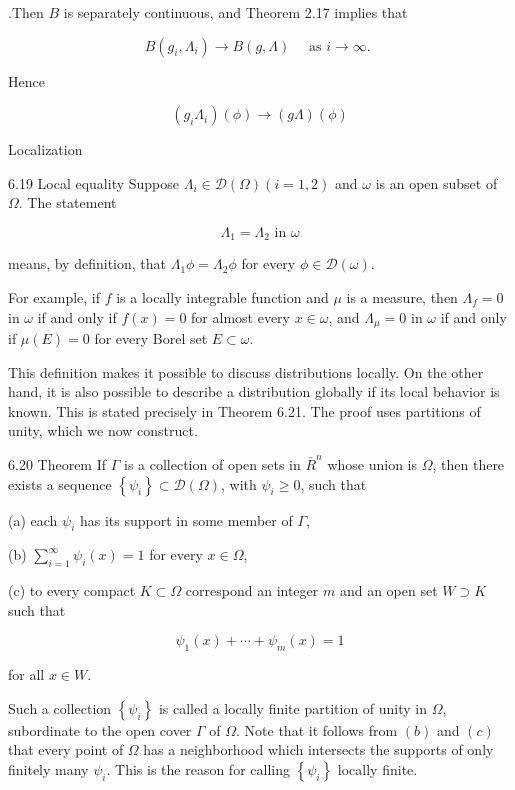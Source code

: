 \documentclass[10pt]{article}
\begin{document}
.Then $B$ is separately continuous, and Theorem 2.17 implies that

$$
B\left(g_{i}, \Lambda_{i}\right) \rightarrow B(g, \Lambda) \quad \text { as } i \rightarrow \infty \text {. }
$$

Hence

$$
\left(g_{i} \Lambda_{i}\right)(\phi) \rightarrow(g \Lambda)(\phi)
$$

Localization

6.19 Local equality Suppose $\Lambda_{i} \in \mathscr{D}(\Omega)(i=1,2)$ and $\omega$ is an open subset of $\Omega$. The statement

$$
\Lambda_{1}=\Lambda_{2} \text { in } \omega
$$

means, by definition, that $\Lambda_{1} \phi=\Lambda_{2} \phi$ for every $\phi \in \mathscr{D}(\omega)$.

For example, if $f$ is a locally integrable function and $\mu$ is a measure, then $\Lambda_{f}=0$ in $\omega$ if and only if $f(x)=0$ for almost every $x \in \omega$, and $\Lambda_{\mu}=0$ in $\omega$ if and only if $\mu(E)=0$ for every Borel set $E \subset \omega$.

This definition makes it possible to discuss distributions locally. On the other hand, it is also possible to describe a distribution globally if its local behavior is known. This is stated precisely in Theorem 6.21. The proof uses partitions of unity, which we now construct.

6.20 Theorem If $\Gamma$ is a collection of open sets in $\bar{R}^{n}$ whose union is $\Omega$, then there exists a sequence $\left\{\psi_{i}\right\} \subset \mathscr{D}(\Omega)$, with $\psi_{i} \geq 0$, such that

(a) each $\psi_{i}$ has its support in some member of $\Gamma$,

(b) $\sum_{i=1}^{\infty} \psi_{i}(x)=1$ for every $x \in \Omega$,

(c) to every compact $K \subset \Omega$ correspond an integer $m$ and an open set $W \supset K$ such that

$$
\psi_{1}(x)+\cdots+\psi_{m}(x)=1
$$

for all $x \in W$.

Such a collection $\left\{\psi_{i}\right\}$ is called a locally finite partition of unity in $\Omega$, subordinate to the open cover $\Gamma$ of $\Omega$. Note that it follows from $(b)$ and $(c)$ that every point of $\Omega$ has a neighborhood which intersects the supports of only finitely many $\psi_{i}$. This is the reason for calling $\left\{\psi_{i}\right\}$ locally finite.
\end{document}
